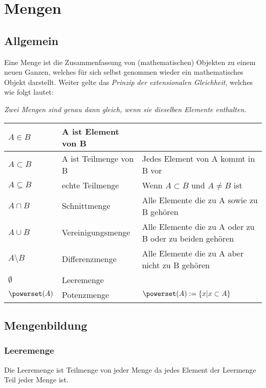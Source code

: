 \chapter{Mengen}
\section{Allgemein}
Eine Menge ist die Zusammenfassung von (mathematischen) Objekten zu einem neuen Ganzen, welches für sich selbst genommen wieder ein mathematisches Objekt darstellt. Weiter gelte das \emph{Prinzip der extensionalen Gleichheit}, welches wie folgt lautet:
\par \hspace*{10mm} \emph{Zwei Mengen sind genau dann gleich, wenn sie dieselben Elemente enthalten.}

\begin{longtable}{|p{}|p{}|p{}|}
	\hline
	\( A \in B \) & A ist Element von B & \\
	\hline
	\( A \subset B \) & A ist Teilmenge von B & Jedes Element von A kommt in B vor \\
	\hline
	\( A \subseteq B \) & echte Teilmenge & Wenn \(A \subset B \) und \(A \neq B \) ist \\
	\hline
	\( A \cap B \) & Schnittmenge & Alle Elemente die zu A sowie zu B gehören \\
	\hline
	\( A \cup B \) & Vereinigungsmenge & Alle Elemente die zu A oder zu B oder zu beiden gehören \\
	\hline
	\( A \setminus B \) & Differenzmenge & Alle Elemente die zu A aber nicht zu B gehören \\
	\hline
	\( \emptyset \) & Leeremenge & \\
	\hline
	\( \powerset(A) \) & Potenzmenge & \( \powerset(A) := \{x|x \subset A\} \) \\
	\hline
\end{longtable}

\section{Mengenbildung}
\subsection{Leeremenge}
Die Leeremenge ist Teilmenge von jeder Menge da jedes Element der Leermenge Teil jeder Menge ist.

